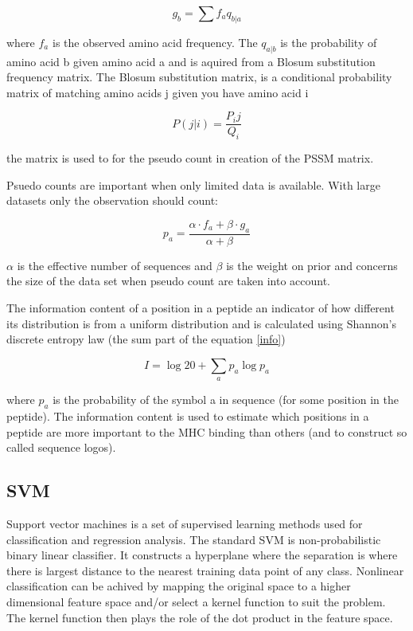 \begin{equation}
g_b = \sum{f_a}{q_{b|a}}
\end{equation}

where $f_a$ is the observed amino acid frequency. The $q_{a|b}$ is the probability of amino acid b given amino acid a and is aquired from a Blosum substitution frequency matrix.
The Blosum substitution matrix, is a
conditional probability matrix of matching amino
acids j given you have amino acid i

\begin{equation}
P(j|i) = \frac{P_ij}{Q_i}
\end{equation}

the matrix is used to for the pseudo count in creation of the PSSM matrix. 

Psuedo counts are important when only limited data is available. With large datasets only the observation should count:

\begin{equation}
p_a = \frac{\alpha \cdot f_a + \beta \cdot g_a}{\alpha + \beta}
\end{equation}

$\alpha$ is the effective number of sequences and $\beta$ is the weight on prior and concerns the size of the data set when pseudo count are taken into account.

The information content of a position in a peptide an indicator of how different its distribution is from a uniform distribution and is calculated using Shannon's discrete entropy law (the sum part of the equation \ref{info})

\begin{equation}
\label{info}
I = \log{ 20 } + \sum_{a}{ p_{a}\log{p_{a}} }
\end{equation}

where $p_a$ is the probability of the symbol a in sequence (for some position in the peptide). The information content is used to estimate which positions in a peptide are more important to the MHC binding than others 
(and to construct so called sequence logos).

\subsection*{SVM}
Support vector machines is a set of supervised learning methods used for classification and regression analysis. 
The standard SVM is non-probabilistic binary linear classifier. 
It constructs a hyperplane where the separation is where there is largest distance to the nearest training data point of any class. 
Nonlinear classification can be achived by  mapping the original space to a higher dimensional feature space and/or select a kernel function to suit the problem. 
The kernel function then plays the role of the dot product in the feature space.

